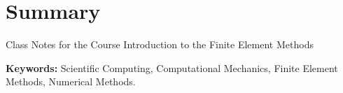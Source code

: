 %
\chapter*{Summary}

\vspace{-1cm}

Class Notes for the Course Introduction to the Finite Element Methods


\textbf{Keywords: } Scientific Computing, Computational Mechanics, Finite Element Methods, Numerical Methods. 
